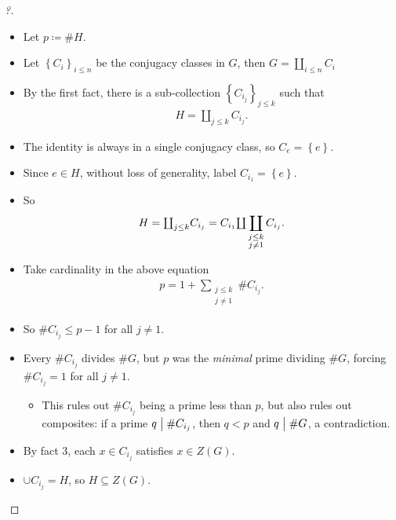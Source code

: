 \begin{proof}[?]

\envlist

\begin{itemize}
\item
  Let \(p \coloneqq\#H\).
\item
  Let \(\left\{{ C_i }\right\}_{i\leq n}\) be the conjugacy classes in
  \(G\), then \(G = {\textstyle\coprod}_{i\leq n} C_i\)
\item
  By the first fact, there is a sub-collection
  \(\left\{{ C_{i_j}}\right\}_{j\leq k }\) such that
  \begin{align*}
  H = {\textstyle\coprod}_{j\leq k} C_{i_j}
  .\end{align*}
\item
  The identity is always in a single conjugacy class, so
  \(C_e = \left\{{ e }\right\}\).
\item
  Since \(e\in H\), without loss of generality, label
  \(C_{i_1} = \left\{{ e }\right\}\).
\item
  So
  \begin{align*}
  H 
  = {\textstyle\coprod}_{j\leq k} C_{i_j} 
  = C_{i_1}{\textstyle  \coprod} \displaystyle\displaystyle\coprod_{\substack{ j\leq k \\ j\neq 1} } C_{i_j} 
  .\end{align*}
\item
  Take cardinality in the above equation
  \begin{align*}
  p = 1 + \sum_{\substack{ j\leq k \\ j\neq 1 }} \# C_{i_j}
  .\end{align*}
\item
  So \(\# C_{i_j} \leq p-1\) for all \(j\neq 1\).
\item
  Every \(\# C_{i_j}\) divides \(\# G\), but \(p\) was the
  \emph{minimal} prime dividing \(\# G\), forcing \(\# C_{i_j} = 1\) for
  all \(j \neq 1\).

  \begin{itemize}
  \tightlist
  \item
    This rules out \(\# C_{i_j}\) being a prime less than \(p\), but
    also rules out composites: if a prime \(q\bigm|\# C_{i_j}\), then
    \(q<p\) and \(q\bigm|\# G\), a contradiction.
  \end{itemize}
\item
  By fact 3, each \(x\in C_{i_j}\) satisfies \(x\in Z(G)\).
\item
  \(\cup C_{i_j} = H\), so \(H \subseteq Z(G)\).
\end{itemize}

\end{proof}

